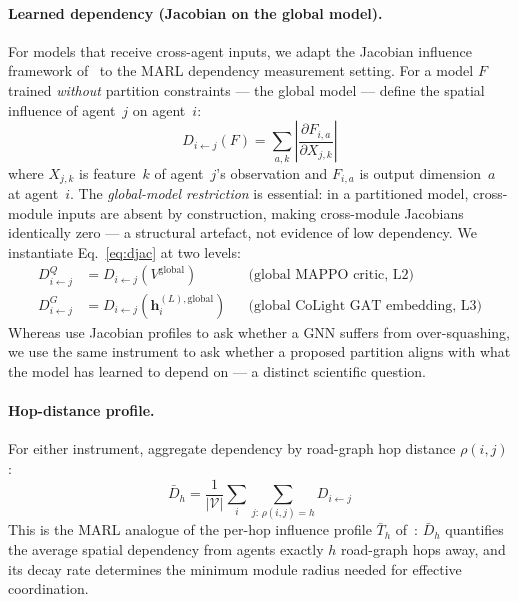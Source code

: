 \documentclass{article}
\begin{document}
\paragraph{Learned dependency (Jacobian on the global model).}
For models that receive cross-agent inputs, we adapt the Jacobian influence
framework of~\citet{lrd2025} to the MARL dependency measurement setting.
For a model $F$ trained \emph{without} partition constraints — the global model
— define the spatial influence of agent~$j$ on agent~$i$:
\begin{equation}
    D_{i\leftarrow j}(F)
    = \sum_{a,k}
    \left|\frac{\partial F_{i,a}}{\partial X_{j,k}}\right|
    \label{eq:djac}
\end{equation}
where $X_{j,k}$ is feature~$k$ of agent~$j$'s observation and $F_{i,a}$ is
output dimension~$a$ at agent~$i$.
The \emph{global-model restriction} is essential: in a partitioned model,
cross-module inputs are absent by construction, making cross-module Jacobians
identically zero — a structural artefact, not evidence of low dependency.
We instantiate Eq.~\eqref{eq:djac} at two levels:
\begin{align}
    D^{Q}_{i\leftarrow j}
     & = D_{i\leftarrow j}(V^{\mathrm{global}})
     &                                                         & \text{(global MAPPO critic, L2)}
    \label{eq:dq}                                                                                          \\
    D^{G}_{i\leftarrow j}
     & = D_{i\leftarrow j}(\mathbf{h}^{(L),\mathrm{global}}_i)
     &                                                         & \text{(global CoLight GAT embedding, L3)}
    \label{eq:dg}
\end{align}
Whereas \citet{lrd2025} use Jacobian profiles to ask whether a GNN suffers
from over-squashing, we use the same instrument to ask whether a proposed partition
aligns with what the model has learned to depend on — a distinct scientific question.

\paragraph{Hop-distance profile.}
For either instrument, aggregate dependency by road-graph hop distance $\rho(i,j)$:
\begin{equation}
    \bar{D}_h
    = \frac{1}{|\mathcal{V}|}\sum_{i}\sum_{j:\,\rho(i,j)=h} D_{i\leftarrow j}
    \label{eq:barDh}
\end{equation}
This is the MARL analogue of the per-hop influence profile $\bar{T}_h$
of~\citet{lrd2025}: $\bar{D}_h$ quantifies the average spatial dependency
from agents exactly $h$ road-graph hops away, and its decay rate determines
the minimum module radius needed for effective coordination.
\end{document}
